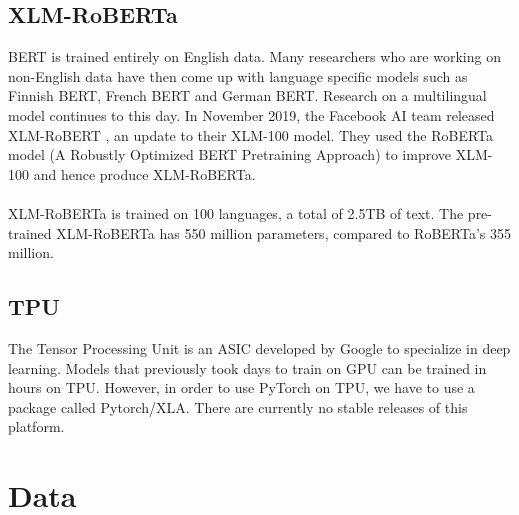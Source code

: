 \documentclass[11pt,a4paper]{article}
\begin{document}
\subsection{XLM-RoBERTa}

BERT is trained entirely on English data. Many researchers who are working on non-English data have then come up with language specific models such as Finnish BERT, French BERT and German BERT. Research on a multilingual model continues to this day. In November 2019, the Facebook AI team released XLM-RoBERT \cite{xlm-roberta}, an update to their XLM-100 model. They used the RoBERTa \cite{roberta} model (A Robustly Optimized BERT Pretraining Approach) to improve XLM-100 and hence produce XLM-RoBERTa.\\
\\
XLM-RoBERTa is trained on 100 languages, a total of 2.5TB of text. The pre-trained XLM-RoBERTa has 550 million parameters, compared to RoBERTa's 355 million.

\subsection{TPU}

The Tensor Processing Unit is an ASIC developed by Google to specialize in deep learning. Models that previously took days to train on GPU can be trained in hours on TPU. However, in order to use PyTorch on TPU, we have to use a package called Pytorch/XLA. There are currently no stable releases of this platform.

\section{Data}
\end{document}
